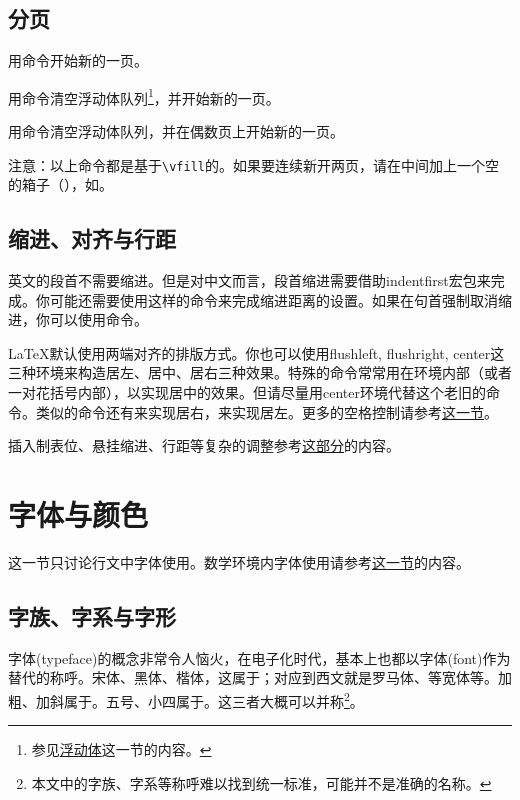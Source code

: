 {\subsection{分页}
用\latexline{\\newpage}命令开始新的一页。

用\latexline{\\clearpage}命令清空浮动体队列\footnote{参见\hyperref[sec:float]{浮动体}这一节的内容。}，并开始新的一页。

用\latexline{\\cleardoublepage}命令清空浮动体队列，并在偶数页上开始新的一页。

注意：以上命令都是基于\verb|\vfill|的。如果要连续新开两页，请在中间加上一个空的箱子（\latexline{\\mbox{}}），如\latexline{\\newpage\\mbox{}\\newpage}。

\subsection{缩进、对齐与行距}
英文的段首不需要缩进。但是对中文而言，段首缩进需要借助indentfirst宏包来完成。你可能还需要使用\latexline{\\setlength{\\indent}{2em}}这样的命令来完成缩进距离的设置。如果在句首强制取消缩进，你可以使用\latexline{\\noindent}命令。

\LaTeX 默认使用两端对齐的排版方式。你也可以使用flushleft, flushright, center这三种环境来构造居左、居中、居右三种效果。特殊的\latexline{\\centering}命令常常用在环境内部（或者一对花括号内部），以实现居中的效果。但请尽量用center环境代替这个老旧的命令。类似的命令还有\latexline{\\raggedleft}来实现居右，\latexline{\\raggedright}来实现居左。更多的空格控制请参考\hyperref[sec:hvspace]{这一节}。

插入制表位、悬挂缩进、行距等复杂的调整参考\hyperref[sec:hvspace]{这部分}的内容。

\section{字体与颜色}
\label{sec:font}
这一节只讨论行文中字体使用。数学环境内字体使用请参考\hyperref[sec:mathfont]{这一节}的内容。

\subsection{字族、字系与字形}
字体(typeface)的概念非常令人恼火，在电子化时代，基本上也都以字体(font)作为替代的称呼。宋体、黑体、楷体，这属于；对应到西文就是罗马体、等宽体等。加粗、加斜属于。五号、小四属于。这三者大概可以并称\footnote{本文中的字族、字系等称呼难以找到统一标准，可能并不是准确的名称。}。

}
